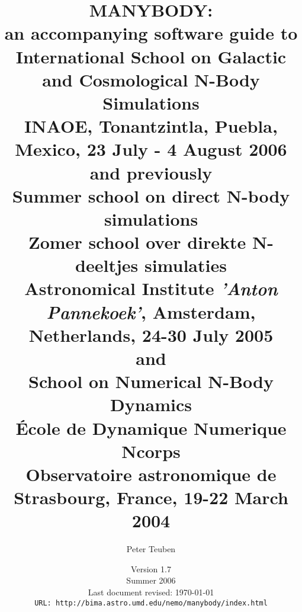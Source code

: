 

\nonstopmode			%

\documentclass[headsepline,normalheadings]{book}



\usepackage{epsfig}


\usepackage{html}
\usepackage{nemo}

\title{ 
{\Huge MANYBODY:} \\
  {\LARGE an accompanying software guide to }\\
  {\bf  International School on Galactic and Cosmological N-Body Simulations} \\
  { INAOE, Tonantzintla, Puebla, Mexico, 23 July - 4 August 2006}\\
  {\small and previously} \\
  {\bf  Summer school on direct N-body simulations} \\
  {\bf  Zomer school over direkte N-deeltjes simulaties} \\
  { Astronomical Institute {\it 'Anton Pannekoek'}, Amsterdam, Netherlands, 24-30 July 2005}\\
  {\small and} \\
  { \bf School on Numerical N-Body Dynamics }\\
  { \bf \'Ecole de Dynamique Numerique Ncorps }\\
  { Observatoire astronomique de Strasbourg, France, 19-22 March 2004}
}


\author{
 {Peter Teuben } \\
       }

\date{{\small Version 1.7} \\
      {\small Summer 2006} \\
      {\small Last document revised: \today} \\ 
      {\small \tt URL: http://bima.astro.umd.edu/nemo/manybody/index.html} \\
     }

\def\eps@scaling{1.0}%
\newcommand\epsscale[1]{\gdef\eps@scaling{#1}}%
\newcommand\plotone[1]{%
 \typeout{Plotone included the file #1}
 \centering
 \leavevmode
 \texttt{[image: \#1]}%
}%

